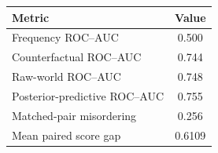 \begin{tabular}{lc}
\toprule
Metric & Value \\
\midrule
Frequency ROC--AUC & 0.500 \\
Counterfactual ROC--AUC & 0.744 \\
Raw-world ROC--AUC & 0.748 \\
Posterior-predictive ROC--AUC & 0.755 \\
Matched-pair misordering & 0.256 \\
Mean paired score gap & 0.6109 \\
\bottomrule
\end{tabular}
